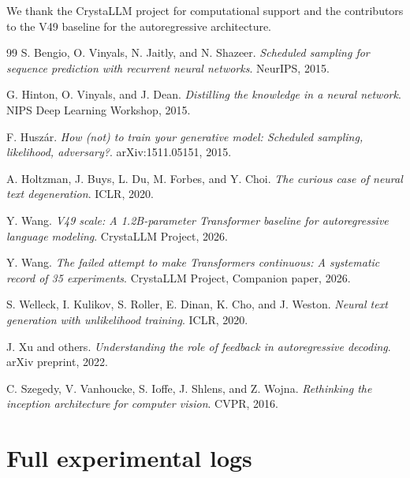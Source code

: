 \documentclass{article}
\begin{document}
We thank the CrystaLLM project for computational support and the contributors to the V49 baseline for the autoregressive architecture.


\begin{thebibliography}{99}
S. Bengio, O. Vinyals, N. Jaitly, and N. Shazeer.
\textit{Scheduled sampling for sequence prediction with recurrent neural networks}.
NeurIPS, 2015.

G. Hinton, O. Vinyals, and J. Dean.
\textit{Distilling the knowledge in a neural network}.
NIPS Deep Learning Workshop, 2015.

F. Huszár.
\textit{How (not) to train your generative model: Scheduled sampling, likelihood, adversary?}.
arXiv:1511.05151, 2015.

A. Holtzman, J. Buys, L. Du, M. Forbes, and Y. Choi.
\textit{The curious case of neural text degeneration}.
ICLR, 2020.

Y. Wang.
\textit{V49 scale: A 1.2B-parameter Transformer baseline for autoregressive language modeling}.
CrystaLLM Project, 2026.

Y. Wang.
\textit{The failed attempt to make Transformers continuous: A systematic record of 35 experiments}.
CrystaLLM Project, Companion paper, 2026.

S. Welleck, I. Kulikov, S. Roller, E. Dinan, K. Cho, and J. Weston.
\textit{Neural text generation with unlikelihood training}.
ICLR, 2020.

J. Xu and others.
\textit{Understanding the role of feedback in autoregressive decoding}.
arXiv preprint, 2022.

C. Szegedy, V. Vanhoucke, S. Ioffe, J. Shlens, and Z. Wojna.
\textit{Rethinking the inception architecture for computer vision}.
CVPR, 2016.
\end{thebibliography}


\appendix

\section{Full experimental logs}
\end{document}
